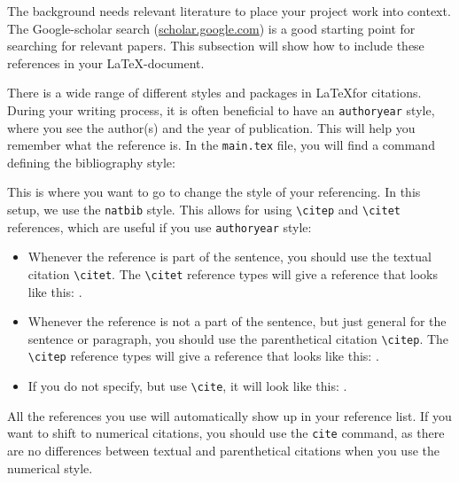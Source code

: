 The background needs relevant literature to place your project work into context. The Google-scholar search (\url{scholar.google.com}) is a good starting point for searching for relevant papers.  This subsection will show how to include these references in your \LaTeX-document.

There is a wide range of different styles and packages in \LaTeX for citations. During your writing process, it is often beneficial to have an \texttt{authoryear} style, where you see the author(s) and the year of publication. This will help you remember what the reference is. In the \texttt{main.tex} file, you will find a command defining the bibliography style:


This is where you want to go to change the style of your referencing. In this setup, we use the \texttt{natbib} style. This allows for using \verb=\citep= and \verb=\citet= references, which are useful if you use \texttt{authoryear} style:
\begin{itemize}
    \item Whenever the reference is part of the sentence, you should use the textual citation \verb=\citet=. The \verb=\citet= reference types will give a reference that looks like this: \citet{berg2014permeability}.
    \item Whenever the reference is not a part of the sentence, but just general for the sentence or paragraph, you should use the parenthetical citation \verb=\citep=. The \verb=\citep= reference types will give a reference that looks like this: \citep{berg2014permeability}.
    \item If you do not specify, but use \verb=\cite=, it will look like this: \cite{berg2014permeability}.
\end{itemize}

All the references you use will automatically show up in your reference list. If you want to shift to numerical citations, you should use the \texttt{cite} command, as there are no differences between textual and parenthetical citations when you use the numerical style.